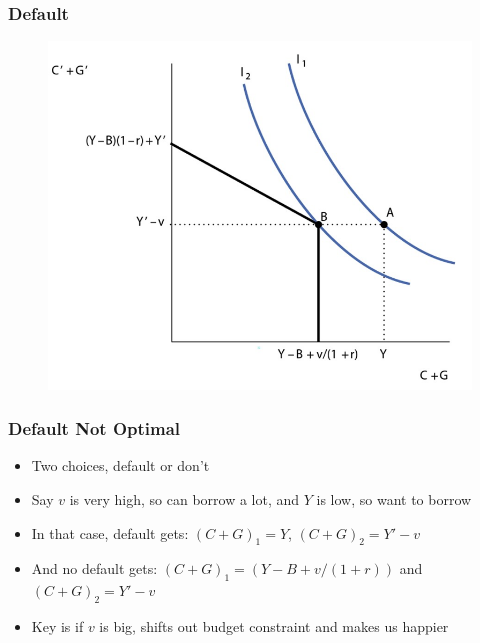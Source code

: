 \documentclass{beamer}
\begin{document}
\begin{frame}
\frametitle[alignment=center]{Default}
\begin{figure}
\centering
\includegraphics[scale=0.7]{Figures/W_Fig_16pt3.png}
\end{figure}
\end{frame}


\begin{frame}
\frametitle[alignment=center]{Default Not Optimal}
\begin{itemize}
\item Two choices, default or don't
\bigskip
\item Say $v$ is very high, so can borrow a lot, and $Y$ is low, so want to borrow
\bigskip
\item In that case, default gets: $(C+G)_1=Y$, $(C+G)_2=Y'-v$
\bigskip
\item And no default gets: $(C+G)_1=(Y-B+v/(1+r))$ and $(C+G)_2=Y'-v$
\bigskip
\item Key is if $v$ is big, shifts out budget constraint and makes us happier
\end{itemize}
\end{frame}
\end{document}
